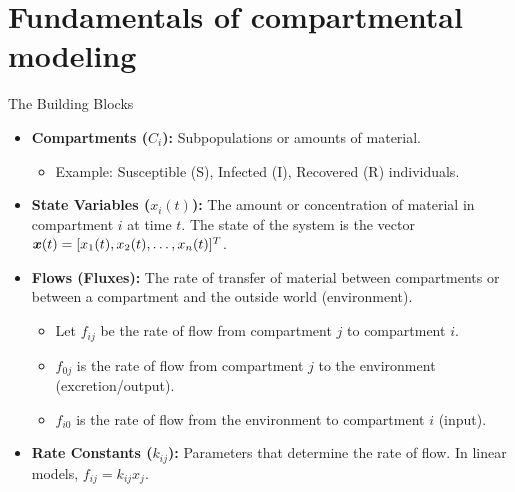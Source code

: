 \documentclass[aspectratio=169]{beamer}\usepackage[]{graphicx}\usepackage[]{xcolor}
\begin{document}
\section{Fundamentals of compartmental modeling}

\begin{frame}{The Building Blocks}
    \begin{itemize}
        \item \textbf{Compartments ($C_i$):} Subpopulations or amounts of material.
        \begin{itemize}
            \item Example: Susceptible (S), Infected (I), Recovered (R) individuals.
        \end{itemize}
        \item \textbf{State Variables ($x_i(t)$):} The amount or concentration of material in compartment $i$ at time $t$. The state of the system is the vector $\bm{x}(t) = [x_1(t), x_2(t), \dots, x_n(t)]^T$.
        \item \textbf{Flows (Fluxes):} The rate of transfer of material between compartments or between a compartment and the outside world (environment).
        \begin{itemize}
            \item Let $f_{ij}$ be the rate of flow from compartment $j$ to compartment $i$.
            \item $f_{0j}$ is the rate of flow from compartment $j$ to the environment (excretion/output).
            \item $f_{i0}$ is the rate of flow from the environment to compartment $i$ (input).
        \end{itemize}
        \item \textbf{Rate Constants ($k_{ij}$):} Parameters that determine the rate of flow. In linear models, $f_{ij} = k_{ij} x_j$.
    \end{itemize}
\end{frame}
\end{document}

